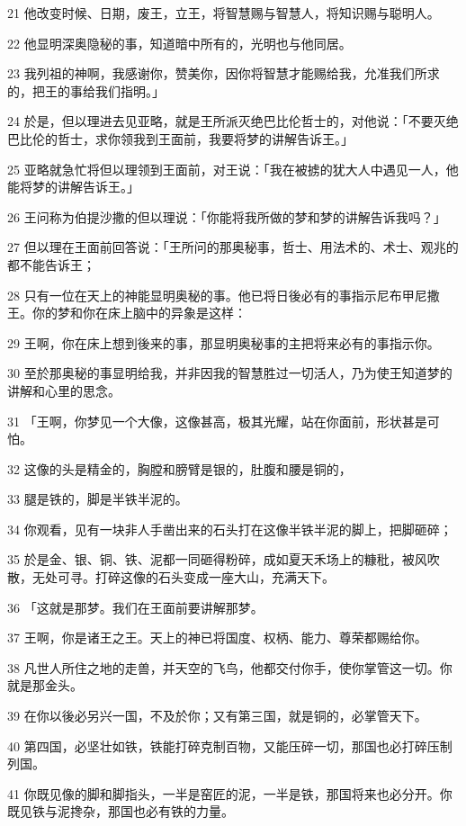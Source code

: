 \par 21 他改变时候、日期，废王，立王，将智慧赐与智慧人，将知识赐与聪明人。
\par 22 他显明深奥隐秘的事，知道暗中所有的，光明也与他同居。
\par 23 我列祖的神啊，我感谢你，赞美你，因你将智慧才能赐给我，允准我们所求的，把王的事给我们指明。」
\par 24 於是，但以理进去见亚略，就是王所派灭绝巴比伦哲士的，对他说：「不要灭绝巴比伦的哲士，求你领我到王面前，我要将梦的讲解告诉王。」
\par 25 亚略就急忙将但以理领到王面前，对王说：「我在被掳的犹大人中遇见一人，他能将梦的讲解告诉王。」
\par 26 王问称为伯提沙撒的但以理说：「你能将我所做的梦和梦的讲解告诉我吗？」
\par 27 但以理在王面前回答说：「王所问的那奥秘事，哲士、用法术的、术士、观兆的都不能告诉王；
\par 28 只有一位在天上的神能显明奥秘的事。他已将日後必有的事指示尼布甲尼撒王。你的梦和你在床上脑中的异象是这样：
\par 29 王啊，你在床上想到後来的事，那显明奥秘事的主把将来必有的事指示你。
\par 30 至於那奥秘的事显明给我，并非因我的智慧胜过一切活人，乃为使王知道梦的讲解和心里的思念。
\par 31 「王啊，你梦见一个大像，这像甚高，极其光耀，站在你面前，形状甚是可怕。
\par 32 这像的头是精金的，胸膛和膀臂是银的，肚腹和腰是铜的，
\par 33 腿是铁的，脚是半铁半泥的。
\par 34 你观看，见有一块非人手凿出来的石头打在这像半铁半泥的脚上，把脚砸碎；
\par 35 於是金、银、铜、铁、泥都一同砸得粉碎，成如夏天禾场上的糠秕，被风吹散，无处可寻。打碎这像的石头变成一座大山，充满天下。
\par 36 「这就是那梦。我们在王面前要讲解那梦。
\par 37 王啊，你是诸王之王。天上的神已将国度、权柄、能力、尊荣都赐给你。
\par 38 凡世人所住之地的走兽，并天空的飞鸟，他都交付你手，使你掌管这一切。你就是那金头。
\par 39 在你以後必另兴一国，不及於你；又有第三国，就是铜的，必掌管天下。
\par 40 第四国，必坚壮如铁，铁能打碎克制百物，又能压碎一切，那国也必打碎压制列国。
\par 41 你既见像的脚和脚指头，一半是窑匠的泥，一半是铁，那国将来也必分开。你既见铁与泥搀杂，那国也必有铁的力量。
